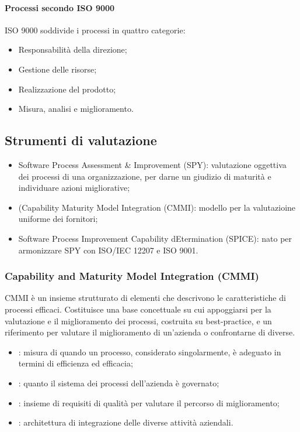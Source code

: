 \paragraph{Processi secondo ISO 9000}
\label{par:processi_secondo_iso_9000}


ISO 9000 soddivide i processi in quattro categorie:

\begin{itemize}
  \item Responsabilità della direzione;
  \item Gestione delle risorse;
  \item Realizzazione del prodotto;
  \item Misura, analisi e miglioramento.
\end{itemize}

\subsection{Strumenti di valutazione}
\label{sub:strumenti_di_valutazione}

\begin{itemize}
  \item Software Process Assessment \& Improvement (SPY): valutazione oggettiva
    dei processi di una organizzazione, per darne un giudizio di maturità e
    individuare azioni migliorative;
  \item (Capability Maturity Model Integration (CMMI): modello per la
    valutazioine uniforme dei fornitori;
  \item Software Process Improvement Capability dEtermination (SPICE): nato per
    armonizzare SPY con ISO/IEC 12207 e ISO 9001.
\end{itemize}

\subsubsection{Capability and Maturity Model Integration (CMMI)}
\label{ssub:capability_and_maturity_model_integration}

CMMI è un insieme strutturato di elementi che descrivono le caratteristiche di
processi efficaci. Costituisce una base concettuale su cui appoggiarsi per la
valutazione e il miglioramento dei processi, costruita su best-practice, e un
riferimento per valutare il miglioramento di un'azienda o confrontarne di
diverse.

\begin{itemize}
  \item {}: misura di quando un processo, considerato
    singolarmente, è adeguato in termini di efficienza ed efficacia;
  \item {}: quanto il sistema dei processi dell'azienda è
    governato;
  \item {}: insieme di requisiti di qualità per valutare il percorso
    di miglioramento;
  \item {}: architettura di integrazione delle diverse
    attività aziendali.
\end{itemize}

